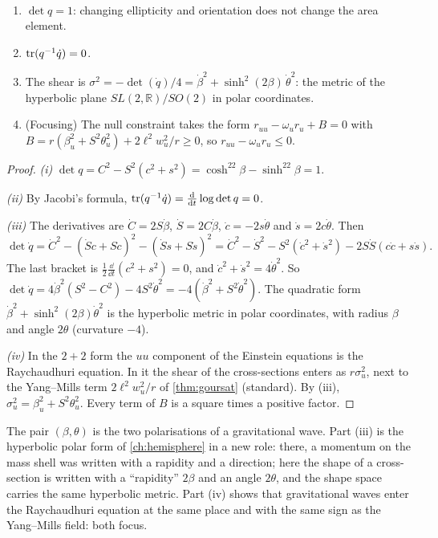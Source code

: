 \begin{theorem}\label{thm:shapespace}\ver\
\begin{enumerate}[label=(\roman*)]
\item $\det q=1$: changing ellipticity and orientation does not change the area element.
\item $\operatorname{tr}(q^{-1}\dot q)=0$.
\item The shear is $\sigma^2=-\det(\dot q)/4=\dot\beta^2+\sinh^2(2\beta)\,\dot\theta^2$: the metric of the hyperbolic plane $SL(2,\mathbb R)/SO(2)$ in polar coordinates.
\item (Focusing) The null constraint takes the form $r_{uu}-\omega_ur_u+B=0$ with $B=r(\beta_u^2+S^2\theta_u^2)+2\ell^2w_u^2/r\ge0$, so $r_{uu}-\omega_ur_u\le0$.
\end{enumerate}
\end{theorem}
\begin{proof}
\emph{(i)} $\det q=C^2-S^2(c^2+s^2)=\cosh^22\beta-\sinh^22\beta=1$.

\emph{(ii)} By Jacobi's formula, $\operatorname{tr}(q^{-1}\dot q)=\frac{\mathrm{d}}{\mathrm{d} t}\log\det q=0$.

\emph{(iii)} The derivatives are $\dot C=2S\dot\beta$, $\dot S=2C\dot\beta$, $\dot c=-2s\dot\theta$ and $\dot s=2c\dot\theta$. Then
\[
\det\dot q=\dot C^2-(\dot Sc+S\dot c)^2-(\dot Ss+S\dot s)^2=\dot C^2-\dot S^2-S^2(\dot c^2+\dot s^2)-2S\dot S(c\dot c+s\dot s).
\]
The last bracket is $\frac12\frac{\dd}{\dd t}(c^2+s^2)=0$, and $\dot c^2+\dot s^2=4\dot\theta^2$. So $\det\dot q=4\dot\beta^2(S^2-C^2)-4S^2\dot\theta^2=-4(\dot\beta^2+S^2\dot\theta^2)$. The quadratic form $\dot\beta^2+\sinh^2(2\beta)\dot\theta^2$ is the hyperbolic metric in polar coordinates, with radius $\beta$ and angle $2\theta$ (curvature $-4$).

\emph{(iv)} In the $2+2$ form the $uu$ component of the Einstein equations is the Raychaudhuri equation. In it the shear of the cross-sections enters as $r\sigma_u^2$, next to the Yang--Mills term $2\ell^2w_u^2/r$ of \cref{thm:goursat} (standard). By (iii), $\sigma_u^2=\beta_u^2+S^2\theta_u^2$. Every term of $B$ is a square times a positive factor.
\end{proof}


The pair $(\beta,\theta)$ is the two polarisations of a gravitational wave. Part (iii) is the hyperbolic polar form of \cref{ch:hemisphere} in a new role: there, a momentum on the mass shell was written with a rapidity and a direction; here the shape of a cross-section is written with a ``rapidity'' $2\beta$ and an angle $2\theta$, and the shape space carries the same hyperbolic metric. Part (iv) shows that gravitational waves enter the Raychaudhuri equation at the same place and with the same sign as the Yang--Mills field: both focus.

